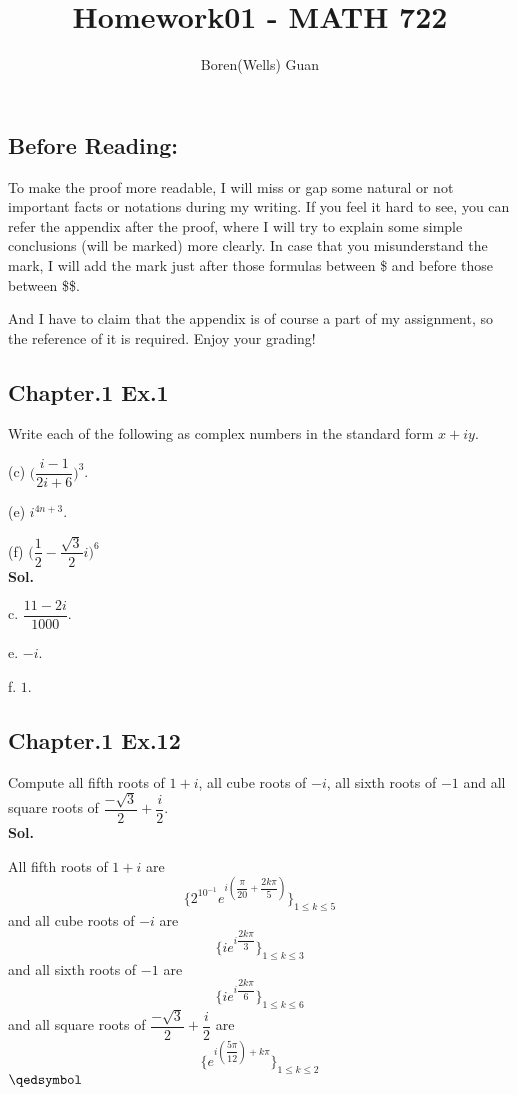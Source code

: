 \documentclass[lang=en,11pt,a4paper,citestyle =authoryear]{elegantpaper}
\title{Homework01 - MATH 722}
\author{Boren(Wells) Guan}
\newcommand{\prvd}{$\hfill \qedsymbol$}
\begin{document}
\maketitle

\subsection*{Before Reading:}\par
To make the proof more readable, I will miss or gap some natural or not important facts or notations during my writing. If you feel it hard to see, you can refer the appendix after the proof, where I will try to explain some simple conclusions (will be marked) more clearly. In case that you misunderstand the mark, I will add the mark just after those formulas between \$ and before those between \$\$.\par
And I have to claim that the appendix is of course a part of my assignment, so the reference of it is required. Enjoy your grading!

\subsection*{Chapter.1 Ex.1} 
Write each of the following as complex numbers in the standard form $x+iy$.\par
(c) $\Big(\dfrac{i-1}{2i+6}\Big)^3$.\par
(e) $i^{4n+3}$.\par
(f) $\Big(\dfrac{1}{2}-\dfrac{\sqrt{3}}{2}i\Big)^6$
\vspace{0.5em}\\
\textbf{Sol.} \par
c. $\dfrac{11-2i}{1000}$.\par
e. $-i$.\par
f. $1$.
\par 
\vspace{0.5em}

\subsection*{Chapter.1 Ex.12} 
Compute all fifth roots of $1+i$, all cube roots of $-i$, all sixth roots of $-1$ and all square roots of $\dfrac{-\sqrt{3}}{2}+\dfrac{i}{2}$.
\vspace{0.5em}\\
\textbf{Sol.} \par
All fifth roots of $1+i$ are \[\{2^{10^{-1}} e^{i(\dfrac{\pi}{20}+\dfrac{2k\pi}{5})}\}_{1 \leq k \leq 5}\]
and all cube roots of $-i$ are
\[\{i e^{i\dfrac{2k\pi}{3}}\}_{1\leq k \leq 3}\]
and all sixth roots of $-1$ are
\[\{i e^{i\dfrac{2k\pi}{6}}\}_{1\leq k \leq 6}\]
and all square roots of $\dfrac{-\sqrt{3}}{2}+\dfrac{i}{2}$ are
\[\{e^{i(\dfrac{5\pi}{12})+k\pi}\}_{1\leq k \leq 2}\]
\prvd
\vspace{0.5em}
\end{document}
